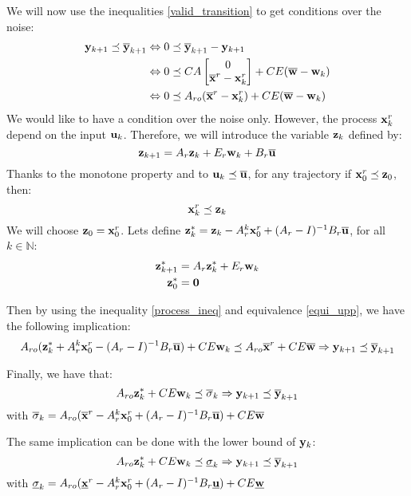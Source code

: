 We will now use the inequalities \ref{valid_transition} to get conditions over the noise:
\begin{align}
 \mathbf{y}_{k+1} \preceq \overline{ \mathbf{y}}_{k+1}
& \Leftrightarrow
0 \preceq \overline{ \mathbf{y}}_{k+1} -  \mathbf{y}_{k+1}
\nonumber \\
& \Leftrightarrow
0 \preceq
C A \begin{bmatrix} 0 \\ \overline{ \mathbf{x}}^r- \mathbf{x}^r_k \end{bmatrix}
+ C E (\overline{ \mathbf{w}} - \mathbf{w}_{k})
\nonumber \\
& \Leftrightarrow
0 \preceq
A_{ro} ( \overline{ \mathbf{x}}^r- \mathbf{x}^r_k ) + C E (\overline{ \mathbf{w}} - \mathbf{w}_{k})
\label{equi_upp}
\end{align}
We would like to have a condition over the noise only. However, the process $ \mathbf{x}^r_k$ depend on the input $ \mathbf{u}_{k}$. Therefore, we will introduce the variable $ \mathbf{z}_k$ defined by:
\begin{equation}
 \mathbf{z}_{k+1} = A_r  \mathbf{z}_k + E_r  \mathbf{w}_{k} + B_r \overline{ \mathbf{u}}
\end{equation}
Thanks to the monotone property and to $ \mathbf{u}_{k} \preceq \overline{ \mathbf{u}}$, for any trajectory if $ \mathbf{x}^r_0 \preceq  \mathbf{z}_0$, then:
\begin{equation}\label{process_ineq}
 \mathbf{x}^r_{k} \preceq  \mathbf{z}_k
\end{equation}
We will choose $ \mathbf{z}_0  =  \mathbf{x}^r_0$.
Lets define $ \mathbf{z}_k^* =  \mathbf{z}_k - A_r^k  \mathbf{x}^r_0  + (A_r-I)^{-1} B_r \overline{ \mathbf{u}}$, for all $k\in \mathbb{N}$:
\begin{equation}
\begin{split}
 \mathbf{z}_{k+1}^* &= A_r  \mathbf{z}_k^* + E_r  \mathbf{w}_{k}\\
 \mathbf{z}_0^* &=  \mathbf{0}
\end{split}
\end{equation}

Then by using the inequality \ref{process_ineq} and equivalence \ref{equi_upp}, we have the following implication:
\begin{equation}
A_{ro} ( \mathbf{z}_k^* + A_r^k  \mathbf{x}^r_0 - (A_r-I)^{-1} B_r \overline{ \mathbf{u}} ) + CE  \mathbf{w}_{k} 
\preceq A_{ro} \overline{ \mathbf{x}}^r + CE \overline{ \mathbf{w}}
\Rightarrow 
 \mathbf{y}_{k+1} \preceq \overline{ \mathbf{y}}_{k+1}
\end{equation}

\newcommand{\sig}{\sigma}
\newcommand{\ssup}{\msup{\sig}}
\newcommand{\sinf}{\minf{\sig}}
Finally, we have that:
\begin{equation}
\Aro \zk^* + CE \wk 
\mleq 
\ssup_k
\Rightarrow 
\ykn \mleq \sykn
\label{impl_upp}
\end{equation}
with $\ssup_k = \Aro ( \xrsup - \Ar^k \xr_0 + (\Ar-I)^{-1} \Br \msup{\u} ) + CE \msup{\w}$

The same implication can be done with the lower bound of $ \mathbf{y}_{k}$:
\begin{equation}
\Aro \zk^* + CE \wk 
\mleq 
\sinf_k
\Rightarrow 
\ykn \mleq \sykn
\label{impl_low}
\end{equation}
with $\sinf_k = \Aro ( \xrinf - \Ar^k \xr_0 + (\Ar-I)^{-1} \Br \minf{\u} ) + CE \minf{\w}$

